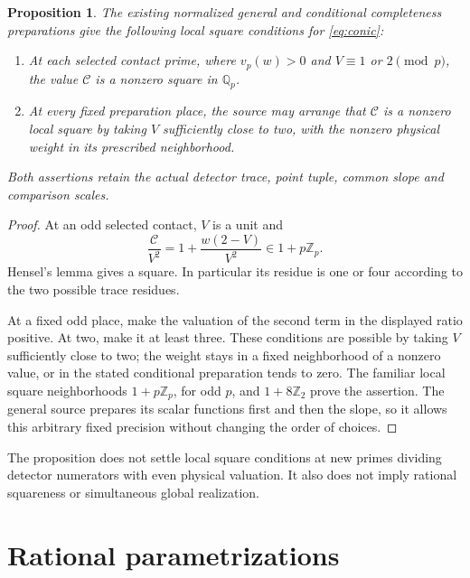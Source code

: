 \documentclass[11pt,a4paper]{article}
\newtheorem{proposition}[theorem]{Proposition}
\newcommand{\Q}{\mathbb Q}\newcommand{\Z}{\mathbb Z}
\begin{document}
\begin{proposition}\label{prop:local}
The existing normalized general and conditional completeness
preparations give the following local square conditions for
\eqref{eq:conic}:
\begin{enumerate}
\item At each selected contact prime, where \(v_p(w)>0\) and
\(V\equiv1\) or \(2\pmod p\), the value \(\mathcal C\) is
a nonzero square in \(\Q_p\).
\item At every fixed preparation place, the source may arrange that
\(\mathcal C\) is a nonzero local square by taking \(V\) sufficiently
close to two, with the nonzero physical weight in its prescribed
neighborhood.
\end{enumerate}
Both assertions retain the actual detector trace, point tuple, common
slope and comparison scales.
\end{proposition}
\begin{proof}
At an odd selected contact, \(V\) is a unit and
\[
             \frac{\mathcal C}{V^2}
             =1+\frac{w(2-V)}{V^2}\in1+p\Z_p.
\]
Hensel's lemma gives a square. In particular its residue is one or
four according to the two possible trace residues.

At a fixed odd place, make the valuation of the second term in the
displayed ratio positive. At two, make it at least three. These
conditions are possible by taking \(V\) sufficiently close to two;
the weight stays in a fixed neighborhood of a nonzero value, or in
the stated conditional preparation tends to zero. The familiar local
square neighborhoods \(1+p\Z_p\), for odd \(p\), and
\(1+8\Z_2\) prove the assertion. The general source prepares its
scalar functions first and then the slope, so it allows this arbitrary
fixed precision without changing the order of choices.
\end{proof}

The proposition does not settle local square conditions at new primes
dividing detector numerators with even physical valuation. It also
does not imply rational squareness or simultaneous global realization.

\section{Rational parametrizations}
\end{document}
